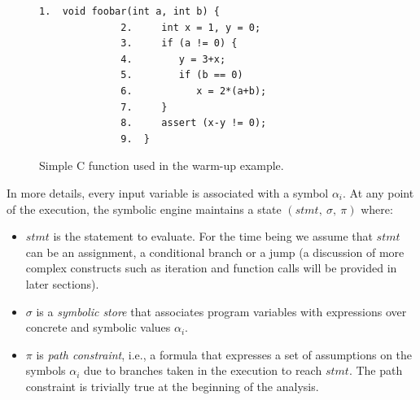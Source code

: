 \begin{figure}[t]
\begin{lstlisting}[basicstyle=\ttfamily\small]
              1.  void foobar(int a, int b) {
              2.     int x = 1, y = 0;
              3.     if (a != 0) {
              4.        y = 3+x;
              5.        if (b == 0)
              6.           x = 2*(a+b);
              7.     }
              8.     assert (x-y != 0);
              9.  }
\end{lstlisting}
\caption{Simple C function used in the warm-up example.}
\label{fig:example-1}
\end{figure}

In more details, every input variable is associated with a symbol $\alpha_i$.  At any point of the execution, the symbolic engine maintains a state $(stmt,~\sigma,~\pi)$ where:

\begin{itemize}

\item $stmt$ is the statement to evaluate. For the time being we assume that $stmt$ can be an assignment, a conditional branch or a jump (a discussion of more complex constructs such as iteration and function calls will be provided in later sections).

\item $\sigma$ is a {\em symbolic store} that associates program variables with expressions over concrete and symbolic values $\alpha_i$.

  \item $\pi$ is {\em path constraint}, i.e., a formula that expresses a set of assumptions on the symbols $\alpha_i$ due to branches taken in the execution to reach $stmt$. The path constraint is trivially true at the beginning of the analysis.

\end{itemize}

